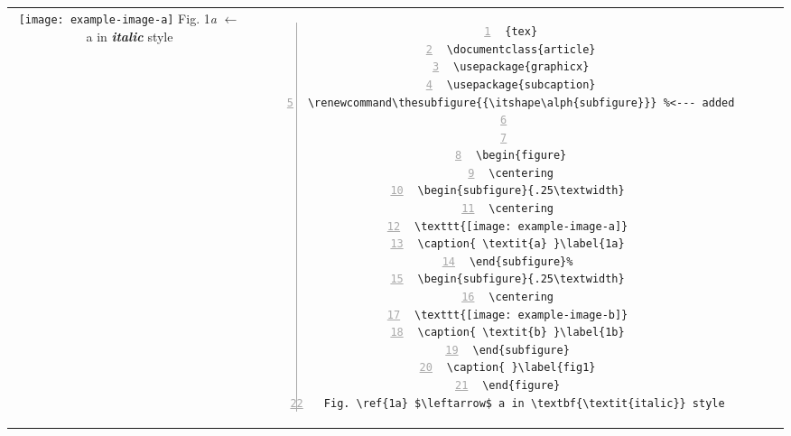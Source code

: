 {\subsection{}

\begin{tabular}{c | c}
\begin{minipage}[m]{0.4\textwidth}
\centering
\texttt{[image: example-image-a]}
Fig.  1\textit{a} $\leftarrow$ a in \textbf{\textit{italic}} style
\end{minipage}
&
\begin{minipage}[m]{0.55\textwidth}
\renewcommand\textminus{\mbox{-}}%
\begin{lstlisting}[numberstyle=\zebra{red!15}{green!15},numbers=left,basicstyle=\ttfamily\scriptsize]{tex}
\documentclass{article}
\usepackage{graphicx}
\usepackage{subcaption}
\renewcommand\thesubfigure{{\itshape\alph{subfigure}}} %<--- added


\begin{figure}
\centering
\begin{subfigure}{.25\textwidth}
\centering
\texttt{[image: example-image-a]}
\caption{ \textit{a} }\label{1a}
\end{subfigure}%
\begin{subfigure}{.25\textwidth}
\centering
\texttt{[image: example-image-b]}
\caption{ \textit{b} }\label{1b}
\end{subfigure}
\caption{ }\label{fig1}
\end{figure}
 Fig. \ref{1a} $\leftarrow$ a in \textbf{\textit{italic}} style

\end{lstlisting}
\end{minipage}
\end{tabular}
 }


 
\subsection{}
 
